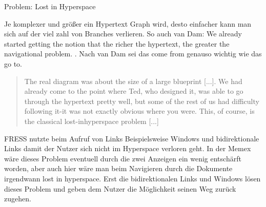 \begin{section}{Problem: Lost in Hyperspace}
\label{sec:lostInHyperspace}

Je komplexer und größer ein Hypertext Graph wird, desto einfacher kann man sich auf der viel zahl von Branches verlieren. So auch van Dam: \glqq We already started getting the notion that the richer the hypertext, the greater the navigational problem. \grqq{ }. Nach van Dam sei das \glqq come from\grqq{ } genauso wichtig wie das \glqq go to\grqq{ }\cite{Dam1988}.

\begin{quote}
\glqq [...] The real diagram was about the size of a large blueprint [...]. We had already come to the point where Ted, who designed it, was able to go through the hypertext pretty well, but some of the rest of us had difficulty following it-it was not exactly obvious where you were. This, of course, is the classical lost-inhyperspace problem [...]\grqq{ }\cite{Dam1988}
\end{quote}

FRESS nutzte beim Aufruf von Links Beispielsweise Windows und bidirektionale Links damit der Nutzer sich nicht im Hyperspace verloren geht. In der Memex wäre dieses Problem eventuell durch die zwei Anzeigen ein wenig entschärft worden, aber auch hier wäre man beim Navigieren durch die Dokumente irgendwann \glqq lost in hyperspace\grqq. Erst die bidirektionalen Links und Windows lösen dieses Problem und geben dem Nutzer die Möglichkeit seinen Weg zurück zugehen.

\end{section}

